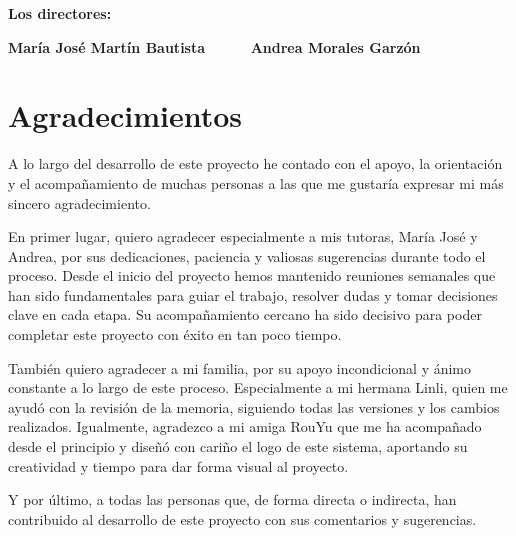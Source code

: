 \textbf{Los directores:}

\vspace{5cm}

\noindent \textbf{María José Martín Bautista \ \ \ \ \ Andrea Morales Garzón}

\chapter*{Agradecimientos}
\thispagestyle{empty}

       \vspace{1cm}


A lo largo del desarrollo de este proyecto he contado con el apoyo, la orientación y el acompañamiento de muchas personas a las que me gustaría expresar mi más sincero agradecimiento.

En primer lugar, quiero agradecer especialmente a mis tutoras, María José y Andrea, por sus dedicaciones, paciencia y valiosas sugerencias durante todo el proceso. Desde el inicio del proyecto hemos mantenido reuniones semanales que han sido fundamentales para guiar el trabajo, resolver dudas y tomar decisiones clave en cada etapa. Su acompañamiento cercano ha sido decisivo para poder completar este proyecto con éxito en tan poco tiempo. 

También quiero agradecer a mi familia, por su apoyo incondicional y ánimo constante a lo largo de este proceso. Especialmente a mi hermana Linli, quien me ayudó con la revisión de la memoria, siguiendo todas las versiones y los cambios realizados. Igualmente, agradezco a mi amiga RouYu que me ha acompañado desde el principio y diseñó con cariño el logo de este sistema, aportando su creatividad y tiempo para dar forma visual al proyecto. 

Y por último, a todas las personas que, de forma directa o indirecta, han contribuido al desarrollo de este proyecto con sus comentarios y sugerencias.



